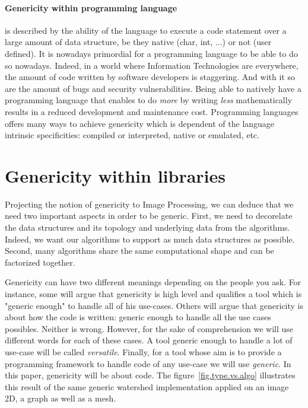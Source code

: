 \paragraph{Genericity within programming language} is described by the ability of the language to execute a code
statement over a large amount of data structure, be they native (char, int, ...) or not (user defined). It is nowadays
primordial for a programming language to be able to do so nowadays. Indeed, in a world where Information Technologies
are everywhere, the amount of code written by software developers is staggering. And with it so are the amount of bugs
and security vulnerabilities. Being able to natively have a programming language that enables to do \emph{more} by
writing \emph{less} mathematically results in a reduced development and maintenance cost. Programming languages offers
many ways to achieve genericity which is dependent of the language intrinsic specificities: compiled or interpreted,
native or emulated, etc.


\section{Genericity within libraries}
\label{genericity.sec.libraries}

Projecting the notion of genericity to Image Processing, we can deduce that we need two important aspects in order to be
generic. First, we need to decorelate the data structures and its topology and underlying data from the algorithms.
Indeed, we want our algorithms to support as much data structures as possible. Second, many algorithms share the same
computational shape and can be factorized together.

Genericity can have two different meanings depending on the people you ask. For instance, some will argue that
genericity is high level and qualifies a tool which is "generic enough" to handle all of his use-cases. Others will
argue that genericity is about how the code is written: generic enough to handle all the use cases possibles. Neither is
wrong. However, for the sake of comprehension we will use different words for each of these cases. A tool generic enough
to handle a lot of use-case will be called \emph{versatile}. Finally, for a tool whose aim is to provide a programming
framework to handle code of any use-case we will use \emph{generic}. In this paper, genericity will be about code. The
figure~\ref{fig.type.vs.algo} illustrates this result of the same generic watershed implementation applied on an image
2D, a graph as well as a mesh.

